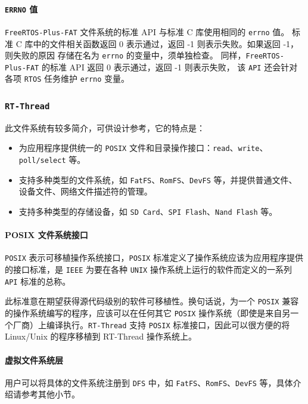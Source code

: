 \documentclass[UTF8,a4paper]{ctexart}
\begin{document}
\paragraph{\texttt{ERRNO} 值} \texttt{FreeRTOS-Plus-FAT} 文件系统的标准 API 与标准 C 库使用相同的 \texttt{errno} 值。
标准 C 库中的文件相关函数返回 0 表示通过，返回 -1 则表示失败。如果返回 -1，则失败的原因 存储在名为 \texttt{errno} 的变量中，须单独检查。 
同样，\texttt{FreeRTOS-Plus-FAT} 的标准 API 返回 0 表示通过，返回 -1 则表示失败， 该 \texttt{API} 还会针对各项 \texttt{RTOS} 任务维护 \texttt{errno} 变量。

\subsubsection{\texttt{RT-Thread}}
此文件系统有较多简介，可供设计参考，它的特点是：
\begin{itemize}
    \item 为应用程序提供统一的 \texttt{POSIX} 文件和目录操作接口：\texttt{read}、\texttt{write}、\texttt{poll/select} 等。
    \item 支持多种类型的文件系统，如 \texttt{FatFS}、\texttt{RomFS}、\texttt{DevFS} 等，并提供普通文件、设备文件、网络文件描述符的管理。
    \item 支持多种类型的存储设备，如 \texttt{SD Card}、\texttt{SPI Flash}、\texttt{Nand Flash} 等。
\end{itemize}
\paragraph{POSIX 文件系统接口}

\texttt{POSIX} 表示可移植操作系统接口，\texttt{POSIX} 标准定义了操作系统应该为应用程序提供的接口标准，是 \texttt{IEEE} 为要在各种 \texttt{UNIX} 操作系统上运行的软件而定义的一系列 \texttt{API} 标准的总称。

此标准意在期望获得源代码级别的软件可移植性。换句话说，为一个 \texttt{POSIX} 兼容的操作系统编写的程序，应该可以在任何其它 \texttt{POSIX} 操作系统（即使是来自另一个厂商）上编译执行。\texttt{RT-Thread} 支持 \texttt{POSIX} 标准接口，因此可以很方便的将 Linux/Unix 的程序移植到 RT-Thread 操作系统上。

\paragraph{虚拟文件系统层}
用户可以将具体的文件系统注册到 \texttt{DFS} 中，如 \texttt{FatFS}、\texttt{RomFS}、\texttt{DevFS} 等，具体介绍请参考其他小节。
\end{document}
